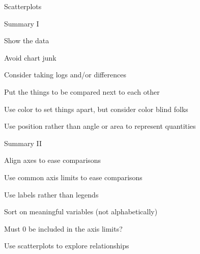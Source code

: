 \documentclass[aspectratio=169,12pt,t]{beamer}
\begin{document}
\begin{frame}[c]{Scatterplots}


\end{frame}



\begin{frame}{Summary I}

\bbi
\item Show the data

\item Avoid chart junk

\item Consider taking logs and/or differences

\item Put the things to be compared next to each other

\item Use color to set things apart, but consider color blind folks

\item Use position rather than angle or area to represent quantities
\ei

\end{frame}



\begin{frame}{Summary II}

\bbi
\item Align axes to ease comparisons

\item Use common axis limits to ease comparisons

\item Use labels rather than legends

\item Sort on meaningful variables (not alphabetically)

\item Must 0 be included in the axis limits?

\item Use scatterplots to explore relationships
\ei

\end{frame}
\end{document}
